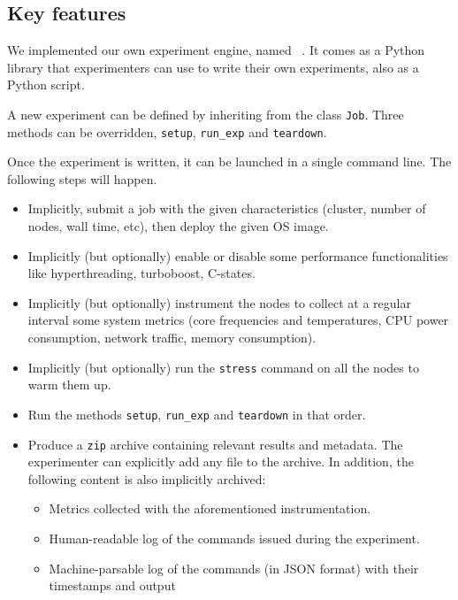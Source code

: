         \subsection{Key features}%
        \label{sub:key_features}
            We implemented our own experiment engine, named \peanut~\cite{peanut}. It comes as a Python library
            that experimenters can use to write their own experiments, also as a Python script.

            A new experiment can be defined by inheriting from the class \texttt{Job}. Three methods can be overridden,
            \texttt{setup}, \texttt{run\_exp} and \texttt{teardown}.

            Once the experiment is written, it can be launched in a single command line. The following steps will
            happen.
            \begin{itemize}
                \item Implicitly, submit a job with the given characteristics (\eg cluster, number of nodes, wall time,
                    etc), then deploy the given OS image.
                \item Implicitly (but optionally) enable or disable some performance functionalities like
                    hyperthreading, turboboost, C-states.
                \item Implicitly (but optionally) instrument the nodes to collect at a regular interval some system
                    metrics (\eg core frequencies and temperatures, CPU power consumption, network traffic, memory
                    consumption).
                \item Implicitly (but optionally) run the \texttt{stress} command on all the nodes to warm them up.
                \item Run the methods \texttt{setup}, \texttt{run\_exp} and \texttt{teardown} in that order.
                \item Produce a \texttt{zip} archive containing relevant results and metadata. The experimenter can
                    explicitly add any file to the archive. In addition, the following content is also implicitly
                    archived:
                    \begin{itemize}
                        \item Metrics collected with the aforementioned instrumentation.
                        \item Human-readable log of the commands issued during the experiment.
                        \item Machine-parsable log of the commands (in JSON format) with their timestamps and output

\end{itemize}
\end{itemize}
